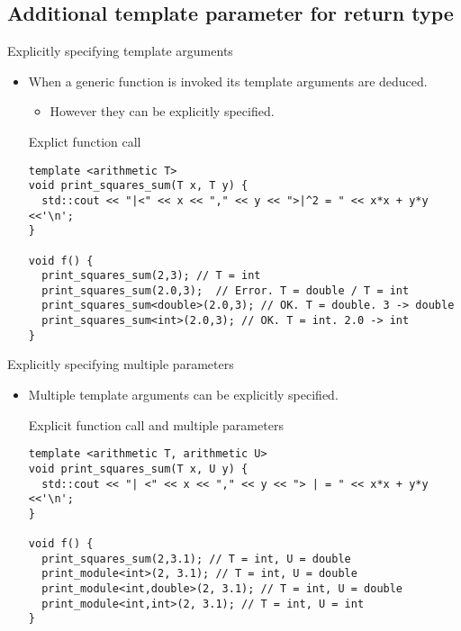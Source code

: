 \subsection{Additional template parameter for return type}

\begin{frame}[t,fragile]{Explicitly specifying template arguments}
\begin{itemize}
  \item When a generic function is invoked its template arguments are deduced.
    \begin{itemize}
      \item However they can be explicitly specified.
    \end{itemize}

\begin{block}{Explict function call}
\begin{lstlisting}
template <arithmetic T>
void print_squares_sum(T x, T y) {
  std::cout << "|<" << x << "," << y << ">|^2 = " << x*x + y*y <<'\n';
}

void f() {
  print_squares_sum(2,3); // T = int
  print_squares_sum(2.0,3);  // Error. T = double / T = int
  print_squares_sum<double>(2.0,3); // OK. T = double. 3 -> double
  print_squares_sum<int>(2.0,3); // OK. T = int. 2.0 -> int
}

\end{lstlisting}
\end{block}

\end{itemize}
\end{frame}

\begin{frame}[t,fragile]{Explicitly specifying multiple parameters}
\begin{itemize}
  \item Multiple template arguments can be explicitly specified.

\begin{block}{Explicit function call and multiple parameters}
\begin{lstlisting}
template <arithmetic T, arithmetic U>
void print_squares_sum(T x, U y) {
  std::cout << "| <" << x << "," << y << "> | = " << x*x + y*y <<'\n';
}

void f() {
  print_squares_sum(2,3.1); // T = int, U = double
  print_module<int>(2, 3.1); // T = int, U = double
  print_module<int,double>(2, 3.1); // T = int, U = double
  print_module<int,int>(2, 3.1); // T = int, U = int
}
\end{lstlisting}
\end{block}

\end{itemize}
\end{frame}

